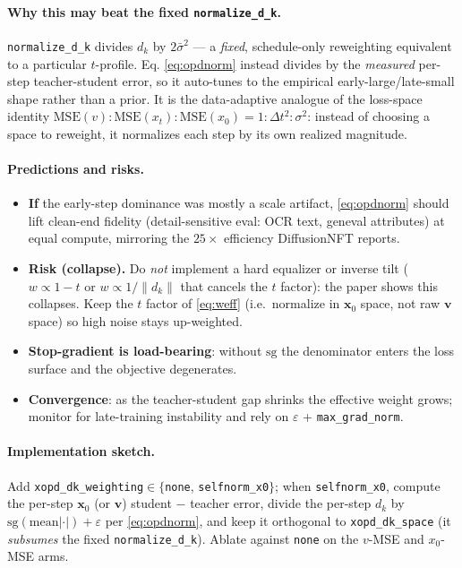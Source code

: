 \documentclass[11pt,a4paper]{article}
\newcommand{\dt}{\Delta t}
\newcommand{\dk}{d_k}
\begin{document}
\paragraph{Why this may beat the fixed \texttt{normalize\_d\_k}.} \texttt{normalize\_d\_k} divides $d_k$ by
$2\bar\sigma^2$ --- a \emph{fixed}, schedule-only reweighting equivalent to a particular $t$-profile. Eq.
\eqref{eq:opdnorm} instead divides by the \emph{measured} per-step teacher-student error, so it auto-tunes
to the empirical early-large/late-small shape rather than a prior. It is the data-adaptive analogue of the
loss-space identity $\mathrm{MSE}(v):\mathrm{MSE}(x_t):\mathrm{MSE}(x_0)=1:\dt^2:\sigma^2$: instead of
choosing a space to reweight, it normalizes each step by its own realized magnitude.

\paragraph{Predictions and risks.}
\begin{itemize}[leftmargin=1.5em]
\item \textbf{If} the early-step dominance was mostly a scale artifact, \eqref{eq:opdnorm} should lift
clean-end fidelity (detail-sensitive eval: OCR text, geneval attributes) at equal compute, mirroring the
$25\times$ efficiency DiffusionNFT reports.
\item \textbf{Risk (collapse).} Do \emph{not} implement a hard equalizer or inverse tilt ($w\propto 1-t$ or
$w\propto 1/\|\dk\|$ that cancels the $t$ factor): the paper shows this collapses. Keep the $t$ factor of
\eqref{eq:weff} (i.e.\ normalize in $\bm{x}_0$ space, not raw $\bm{v}$ space) so high noise stays up-weighted.
\item \textbf{Stop-gradient is load-bearing}: without $\mathrm{sg}$ the denominator enters the loss surface
and the objective degenerates. \item \textbf{Convergence}: as the teacher-student gap shrinks the effective
weight grows; monitor for late-training instability and rely on $\varepsilon$ + \texttt{max\_grad\_norm}.
\end{itemize}

\paragraph{Implementation sketch.} Add \texttt{xopd\_dk\_weighting}$\in\{$\texttt{none},
\texttt{selfnorm\_x0}$\}$; when \texttt{selfnorm\_x0}, compute the per-step $\bm{x}_0$ (or $\bm{v}$) student
$-$ teacher error, divide the per-step $d_k$ by $\mathrm{sg}(\mathrm{mean}|\cdot|)+\varepsilon$ per
\eqref{eq:opdnorm}, and keep it orthogonal to \texttt{xopd\_dk\_space} (it \emph{subsumes} the fixed
\texttt{normalize\_d\_k}). Ablate against \texttt{none} on the $v$-MSE and $x_0$-MSE arms.
\end{document}
